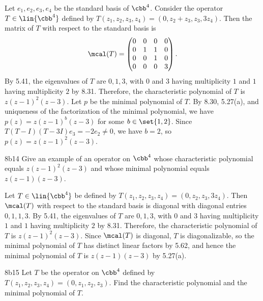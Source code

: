 \begin{sol}
    Let $e_1, e_2, e_3, e_4$ be the standard basis of $\cbb^4$.
    Consider the operator $T \in \lin{\cbb^4}$ defined by $T(z_1, z_2, z_3, z_4) = (0, z_2 + z_3, z_3, 3 z_4)$.
    Then the matrix of $T$ with respect to the standard basis is
    \[
        \mcal(T) = 
        \begin{pmatrix}
            0 & 0 & 0 & 0 \\
            0 & 1 & 1 & 0 \\
            0 & 0 & 1 & 0 \\
            0 & 0 & 0 & 3
        \end{pmatrix}.
    \]
    By 5.41, the eigenvalues of $T$ are $0, 1, 3$, with $0$ and $3$ having multiplicity $1$ and $1$ having multiplicity $2$ by 8.31.
    Therefore, the characteristic polynomial of $T$ is $z(z - 1)^2(z - 3)$.
    Let $p$ be the minimal polynomial of $T$.
    By 8.30, 5.27(a), and uniqueness of the factorization of the minimal polynomial, we have $p(z) = z(z - 1)^b(z - 3)$ for some $b \in \set{1, 2}$.
    Since $T(T - I)(T - 3I) e_3 = -2 e_2 \neq 0$, we have $b = 2$, so $p(z) = z(z - 1)^2(z - 3)$.
\end{sol}

\begin{exercise}{8b14}
    Give an example of an operator on $\cbb^4$ whose characteristic polynomial equals $z(z - 1)^2(z - 3)$ and whose minimal polynomial equals $z(z - 1)(z - 3)$.
\end{exercise}

\begin{sol}
    Let $T \in \lin{\cbb^4}$ be defined by $T(z_1, z_2, z_3, z_4) = (0, z_2, z_3, 3 z_4)$.
    Then $\mcal(T)$ with respect to the standard basis is diagonal with diagonal entries $0, 1, 1, 3$.
    By 5.41, the eigenvalues of $T$ are $0, 1, 3$, with $0$ and $3$ having multiplicity $1$ and $1$ having multiplicity $2$ by 8.31.
    Therefore, the characteristic polynomial of $T$ is $z(z - 1)^2(z - 3)$.
    Since $\mcal(T)$ is diagonal, $T$ is diagonalizable, so the minimal polynomial of $T$ has distinct linear factors by 5.62, and hence the minimal polynomial of $T$ is $z(z - 1)(z - 3)$ by 5.27(a).
\end{sol}

\begin{exercise}{8b15}
    Let $T$ be the operator on $\cbb^4$ defined by $T(z_1, z_2, z_3, z_4) = (0, z_1, z_2, z_3)$.
    Find the characteristic polynomial and the minimal polynomial of $T$.
\end{exercise}


